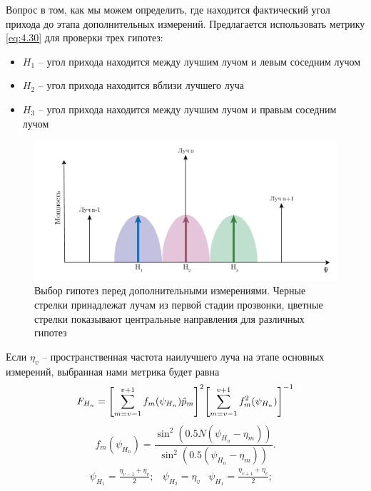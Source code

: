 Вопрос в том, как мы можем определить, где находится фактический угол прихода до этапа дополнительных измерений.
Предлагается использовать метрику \eqref{eq:4.30} для проверки трех гипотез:
\begin{itemize}
    \item $H_1$ -- угол прихода находится между лучшим лучом и левым соседним лучом
    \item $H_2$ -- угол прихода находится вблизи лучшего луча
    \item $H_3$ -- угол прихода находится между лучшим лучом и правым соседним лучом
\end{itemize}

\begin{figure}[h!]
    \centering
    \includegraphics[width=0.75\linewidth]{figs/fig4.13}
    \caption{Выбор гипотез перед дополнительными измерениями. Черные стрелки принадлежат лучам из первой стадии прозвонки, цветные стрелки показывают центральные направления для различных гипотез}
    \label{fig:4.13}
\end{figure}

Если $\eta_v$ --  пространственная частота наилучшего луча на этапе основных измерений, выбранная нами метрика будет равна
\begin{equation}
    \label{eq:4.34}
    F_{H_n} = \qty[\sum\limits_{m=v-1}^{v+1} f_m (\psi_{H_n}) \hat p_m]^2 \qty[\sum\limits_{m=v-1}^{v+1}f_m^2(\psi_{H_n})]^{-1}
\end{equation}
\begin{equation}
    \label{eq:4.35}
    f_m(\psi_{H_n}) = \frac{\sin^2 (0.5N(\psi_{H_n} - \eta_{m}))}{\sin^2(0.5(\psi_{H_n} - \eta_{m}))}.
\end{equation}
\begin{equation}
    \label{eq:4.36}
    \begin{matrix}
        \psi_{H_1} = \frac{\eta_{v-1} + \eta_v}{2}; &
        \psi_{H_2} = \eta_{v}                       &
        \psi_{H_1} = \frac{\eta_{v+1} + \eta_v}{2}; &
    \end{matrix}
\end{equation}


